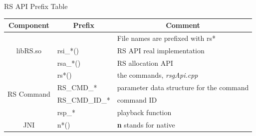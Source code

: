 \begin{center-table}
	\label{t:prefix-table}
	\caption{RS API Prefix Table}
	\renewcommand{\arraystretch}{1.0}
	\begin{tabularx}{\textwidth}{| c | X | X |}
		\hline
		\multicolumn{1}{|c|}{\textbf{Component}} &
		\multicolumn{1}{c|}{\textbf{Prefix}} &
		\multicolumn{1}{c|}{\textbf{Comment}} \\
		\hline\hline
		\multirow{3}{*}{libRS.so} & %
		 &%
		File names are prefixed with rs* \\ %
		\cline{2-3}
		
		 &   %
		rsi\_*()\footnotemark  & %
		RS API real implementation \footnotemark 
		\\ %

        & %
		rsa\_*() &%
		RS allocation API  \\ %

		\hline\hline
		\multirow{4}{*}{RS Command} & %
		rs*()\footnotemark & %
		the commands, \textit{rsgApi.cpp}  \\ %
		\cline{2-3}
		& %
		RS\_CMD\_* & %
		parameter data structure for the command \\ %
		\cline{2-3}
		& %
		RS\_CMD\_ID\_* & %
		command ID  \footnotemark 
		\\%
		\cline{2-3}
		& %
		rsp\_*  & %
		playback function \footnotemark %
		\\
		\hline\hline
		JNI & %
		n*() & %
		\textbf{n} stands for native %
		\\
		\hline
	\end{tabularx}
\end{center-table}

